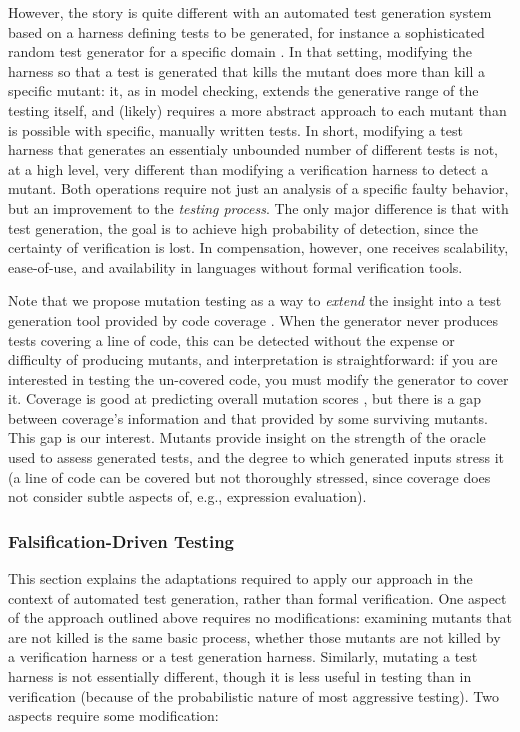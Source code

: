 \documentclass{svjour3}
\begin{document}
However, the story is quite different with an automated test
generation system based on a harness defining tests to be generated,
for instance a sophisticated random test generator for a specific
domain \cite{ICSEDiff,csmith,tstlsttt,rcutorture}.  In that setting,
modifying the harness so that a test is generated that kills the
mutant does more than kill a specific mutant:  it, as in model
checking, extends the generative range of the testing itself, and
(likely) requires a more abstract approach to each mutant than is
possible with specific, manually written tests.  In short, modifying a
test harness that generates an essentialy unbounded number of
different tests is not, at a high level, very different than modifying
a verification harness to detect a mutant.  Both operations require
not just an analysis of a specific faulty behavior, but an improvement
to the \emph{testing process}.  The only major difference is that with
test generation, the goal is to achieve high probability of detection,
since the certainty of verification is lost.  In compensation,
however, one receives scalability, ease-of-use, and availability in
languages without formal verification tools.

Note that we propose mutation testing as a way to \emph{extend} the insight
into a test generation tool provided by code coverage \cite{CovDisc}.  When the
generator never produces tests covering a line of code, this can be
detected without the expense or difficulty of producing mutants, and
interpretation is straightforward:  if you are interested in testing
the un-covered code, you must modify the generator to cover it.
Coverage is good at predicting overall mutation scores \cite{ISSTA13,ICSE14},
but there is a gap between coverage's information and that provided by
some surviving mutants.  This gap is our interest.
Mutants provide insight on the strength of the oracle
used to assess generated tests, and the degree to which generated
inputs stress it (a line of code can be covered but not thoroughly
stressed, since coverage does not consider subtle aspects of, e.g.,
expression evaluation).

\subsubsection{Falsification-Driven Testing}

This section explains the
adaptations required to apply our approach in the context of automated
test generation, rather than formal verification.
One aspect of the approach outlined above requires no modifications:
examining mutants that are not killed is the same basic process,
whether those mutants are not killed by a verification harness or a
test generation harness.  Similarly, mutating a test harness is not essentially
different, though it is less useful in testing than in verification
(because of the probabilistic nature of most aggressive testing).  Two
aspects require some modification:
\end{document}
